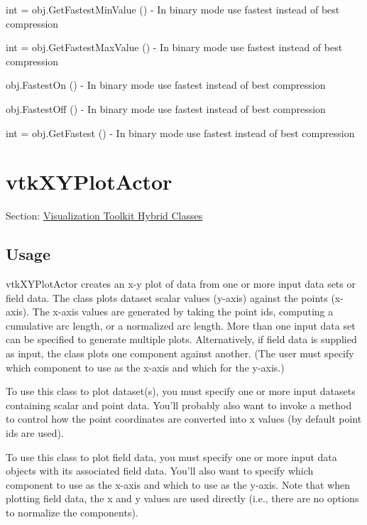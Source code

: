 \begin{DoxyItemize}
\item {\ttfamily int = obj.\-Get\-Fastest\-Min\-Value ()} -\/ In binary mode use fastest instead of best compression  
\item {\ttfamily int = obj.\-Get\-Fastest\-Max\-Value ()} -\/ In binary mode use fastest instead of best compression  
\item {\ttfamily obj.\-Fastest\-On ()} -\/ In binary mode use fastest instead of best compression  
\item {\ttfamily obj.\-Fastest\-Off ()} -\/ In binary mode use fastest instead of best compression  
\item {\ttfamily int = obj.\-Get\-Fastest ()} -\/ In binary mode use fastest instead of best compression  
\end{DoxyItemize}\hypertarget{vtkhybrid_vtkxyplotactor}{}\section{vtk\-X\-Y\-Plot\-Actor}\label{vtkhybrid_vtkxyplotactor}
Section\-: \hyperlink{sec_vtkhybrid}{Visualization Toolkit Hybrid Classes} \hypertarget{vtkwidgets_vtkxyplotwidget_Usage}{}\subsection{Usage}\label{vtkwidgets_vtkxyplotwidget_Usage}
vtk\-X\-Y\-Plot\-Actor creates an x-\/y plot of data from one or more input data sets or field data. The class plots dataset scalar values (y-\/axis) against the points (x-\/axis). The x-\/axis values are generated by taking the point ids, computing a cumulative arc length, or a normalized arc length. More than one input data set can be specified to generate multiple plots. Alternatively, if field data is supplied as input, the class plots one component against another. (The user must specify which component to use as the x-\/axis and which for the y-\/axis.)

To use this class to plot dataset(s), you must specify one or more input datasets containing scalar and point data. You'll probably also want to invoke a method to control how the point coordinates are converted into x values (by default point ids are used).

To use this class to plot field data, you must specify one or more input data objects with its associated field data. You'll also want to specify which component to use as the x-\/axis and which to use as the y-\/axis. Note that when plotting field data, the x and y values are used directly (i.\-e., there are no options to normalize the components).

